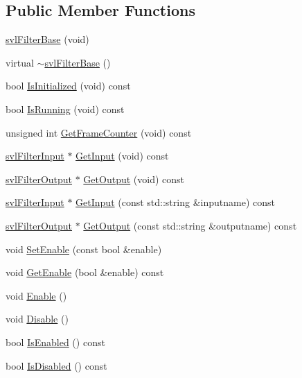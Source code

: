 \subsection*{Public Member Functions}
\begin{DoxyCompactItemize}
\item 
\hyperlink{classsvl_filter_base_a269f783a5c7874b322c9bbd722817b06}{svl\+Filter\+Base} (void)
\item 
virtual \hyperlink{classsvl_filter_base_a7da68763be0344ab0f76e95be8929522}{$\sim$svl\+Filter\+Base} ()
\item 
bool \hyperlink{classsvl_filter_base_adfb3934882187f7d93cca9a53de1a5d2}{Is\+Initialized} (void) const 
\item 
bool \hyperlink{classsvl_filter_base_a106aa0279f50120dcc4c1341bad9b215}{Is\+Running} (void) const 
\item 
unsigned int \hyperlink{classsvl_filter_base_ac8735aa0dc6ac4cd4793f3f5e8a59fd3}{Get\+Frame\+Counter} (void) const 
\item 
\hyperlink{classsvl_filter_input}{svl\+Filter\+Input} $\ast$ \hyperlink{classsvl_filter_base_a213614f22bd7eb9e857047fe23a1b32c}{Get\+Input} (void) const 
\item 
\hyperlink{classsvl_filter_output}{svl\+Filter\+Output} $\ast$ \hyperlink{classsvl_filter_base_adecb846c22f5b733bc390174d4c60604}{Get\+Output} (void) const 
\item 
\hyperlink{classsvl_filter_input}{svl\+Filter\+Input} $\ast$ \hyperlink{classsvl_filter_base_a6504cd87f70537b7d138b773b0f4f2d6}{Get\+Input} (const std\+::string \&inputname) const 
\item 
\hyperlink{classsvl_filter_output}{svl\+Filter\+Output} $\ast$ \hyperlink{classsvl_filter_base_a04754b11d6f30570a11f4d7ef952dbb1}{Get\+Output} (const std\+::string \&outputname) const 
\item 
void \hyperlink{classsvl_filter_base_ae36e9ffa816cbba99408a192b0a40404}{Set\+Enable} (const bool \&enable)
\item 
void \hyperlink{classsvl_filter_base_a91b7098508d20e1a1f47dc6c8daaccaf}{Get\+Enable} (bool \&enable) const 
\item 
void \hyperlink{classsvl_filter_base_aede0eda157c10226a3bbe515c7e0f24e}{Enable} ()
\item 
void \hyperlink{classsvl_filter_base_aec8b5a897df5b716e8160e456e798d5f}{Disable} ()
\item 
bool \hyperlink{classsvl_filter_base_acb531ee3a839026b521f49408412f6d7}{Is\+Enabled} () const 
\item 
bool \hyperlink{classsvl_filter_base_ac16dab2dc8ff2b9850800a87338a940f}{Is\+Disabled} () const 
\end{DoxyCompactItemize}
